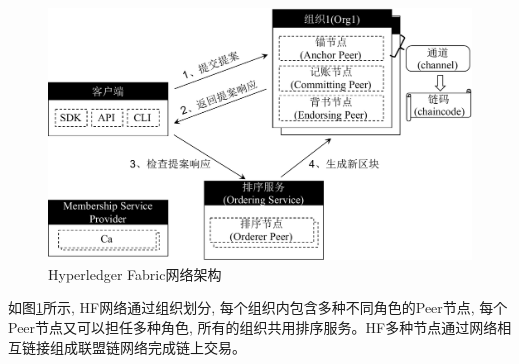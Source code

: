 \begin{figure}[h] %
    \centering %
    \includegraphics[width=1\textwidth]{FIGs/chapter2/hyperledger_fabric.pdf} %
    \caption{Hyperledger Fabric网络架构} %
    \label{hyperledger_fabric} %
\end{figure}%

如图\ref{hyperledger_fabric}所示, HF网络通过组织划分, 每个组织内包含多种不同角色的Peer节点, 每个Peer节点又可以担任多种角色, 所有的组织共用排序服务。HF多种节点通过网络相互链接组成联盟链网络完成链上交易。

